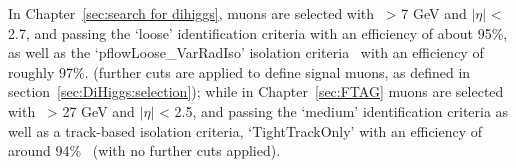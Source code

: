 In Chapter~\ref{sec:search for dihiggs}, muons are selected
with \pt\ > 7 GeV and $|\eta|$ < 2.7, and passing the `loose' 
identification criteria with an efficiency of about 95\%, 
as well as the `pflowLoose\_VarRadIso' 
isolation criteria~\cite{MuonWP} with an efficiency of 
roughly 97\%. 
(further cuts are applied to define signal muons, 
as defined in section~\ref{sec:DiHiggs:selection});
while in Chapter~\ref{sec:FTAG} muons are selected
with \pt\ > 27 GeV and $|\eta|$ < 2.5, and passing the `medium' 
identification criteria as well as a track-based isolation criteria, 
`TightTrackOnly' with an efficiency of around 94\%~\cite{CERN-EP-2020-199} 
(with no further cuts applied).
